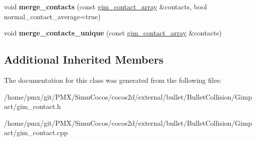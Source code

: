 \begin{DoxyCompactItemize}
\item 
\mbox{\label{classgim__contact__array_a74bc3c96a4552559f250df1528afae99}} 
void {\bfseries merge\+\_\+contacts} (const \hyperlink{classgim__contact__array}{gim\+\_\+contact\+\_\+array} \&contacts, bool normal\+\_\+contact\+\_\+average=true)
\item 
\mbox{\label{classgim__contact__array_ac72ddf0ededc37e0bbf8bdb0fa2f406c}} 
void {\bfseries merge\+\_\+contacts\+\_\+unique} (const \hyperlink{classgim__contact__array}{gim\+\_\+contact\+\_\+array} \&contacts)
\end{DoxyCompactItemize}
\subsection*{Additional Inherited Members}


The documentation for this class was generated from the following files\+:\begin{DoxyCompactItemize}
\item 
/home/pmx/git/\+P\+M\+X/\+Simu\+Cocos/cocos2d/external/bullet/\+Bullet\+Collision/\+Gimpact/gim\+\_\+contact.\+h\item 
/home/pmx/git/\+P\+M\+X/\+Simu\+Cocos/cocos2d/external/bullet/\+Bullet\+Collision/\+Gimpact/gim\+\_\+contact.\+cpp\end{DoxyCompactItemize}
